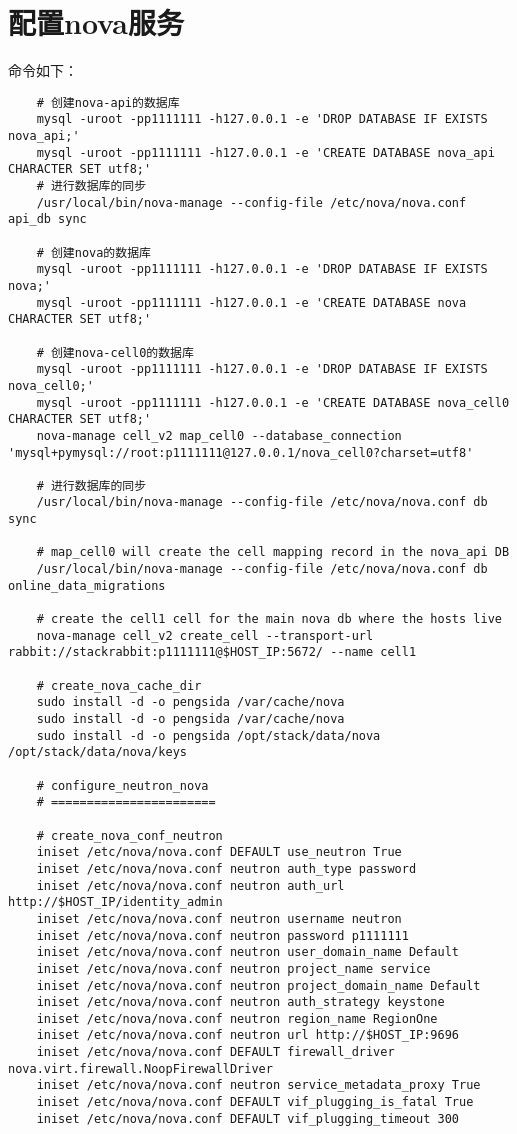 \documentclass[a4paper,left=1.5cm,right=1.5cm,11pt]{article}
\begin{document}
\section{配置nova服务}
	命令如下：
	\begin{lstlisting}
	# 创建nova-api的数据库
	mysql -uroot -pp1111111 -h127.0.0.1 -e 'DROP DATABASE IF EXISTS nova_api;'
	mysql -uroot -pp1111111 -h127.0.0.1 -e 'CREATE DATABASE nova_api CHARACTER SET utf8;'
	# 进行数据库的同步
	/usr/local/bin/nova-manage --config-file /etc/nova/nova.conf api_db sync
	
	# 创建nova的数据库	
	mysql -uroot -pp1111111 -h127.0.0.1 -e 'DROP DATABASE IF EXISTS nova;'
	mysql -uroot -pp1111111 -h127.0.0.1 -e 'CREATE DATABASE nova CHARACTER SET utf8;'

	# 创建nova-cell0的数据库	
	mysql -uroot -pp1111111 -h127.0.0.1 -e 'DROP DATABASE IF EXISTS nova_cell0;'
	mysql -uroot -pp1111111 -h127.0.0.1 -e 'CREATE DATABASE nova_cell0 CHARACTER SET utf8;'
	nova-manage cell_v2 map_cell0 --database_connection 'mysql+pymysql://root:p1111111@127.0.0.1/nova_cell0?charset=utf8'
	
	# 进行数据库的同步
	/usr/local/bin/nova-manage --config-file /etc/nova/nova.conf db sync

	# map_cell0 will create the cell mapping record in the nova_api DB
	/usr/local/bin/nova-manage --config-file /etc/nova/nova.conf db online_data_migrations
	
	# create the cell1 cell for the main nova db where the hosts live
	nova-manage cell_v2 create_cell --transport-url rabbit://stackrabbit:p1111111@$HOST_IP:5672/ --name cell1

	# create_nova_cache_dir
	sudo install -d -o pengsida /var/cache/nova
	sudo install -d -o pengsida /var/cache/nova
	sudo install -d -o pengsida /opt/stack/data/nova /opt/stack/data/nova/keys
	
	# configure_neutron_nova
	# =======================

	# create_nova_conf_neutron
	iniset /etc/nova/nova.conf DEFAULT use_neutron True
	iniset /etc/nova/nova.conf neutron auth_type password
	iniset /etc/nova/nova.conf neutron auth_url http://$HOST_IP/identity_admin
	iniset /etc/nova/nova.conf neutron username neutron
	iniset /etc/nova/nova.conf neutron password p1111111
	iniset /etc/nova/nova.conf neutron user_domain_name Default
	iniset /etc/nova/nova.conf neutron project_name service
	iniset /etc/nova/nova.conf neutron project_domain_name Default
	iniset /etc/nova/nova.conf neutron auth_strategy keystone
	iniset /etc/nova/nova.conf neutron region_name RegionOne
	iniset /etc/nova/nova.conf neutron url http://$HOST_IP:9696
	iniset /etc/nova/nova.conf DEFAULT firewall_driver nova.virt.firewall.NoopFirewallDriver
	iniset /etc/nova/nova.conf neutron service_metadata_proxy True
	iniset /etc/nova/nova.conf DEFAULT vif_plugging_is_fatal True
	iniset /etc/nova/nova.conf DEFAULT vif_plugging_timeout 300
	\end{lstlisting}
\end{document}
